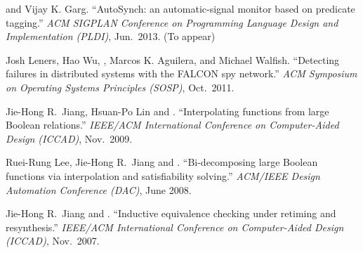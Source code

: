 

\begin{myenumerate}
    \item {} and Vijay K. Garg. ``AutoSynch: an
        automatic-signal monitor based on predicate tagging.'' {\it ACM SIGPLAN
        Conference on Programming Language Design and Implementation (PLDI)},
        Jun.~2013. (To appear)
    \item Josh Leners, Hao Wu, , Marcos K. Aguilera, and 
        Michael Walfish. ``Detecting failures in distributed systems with the 
        FALCON spy network.'' {\it ACM Symposium on Operating Systems 
        Principles (SOSP)}, Oct.~2011.
    \item Jie-Hong R.~Jiang, Hsuan-Po Lin and  .
        ``Interpolating functions from large Boolean relations.'' {\it  
        IEEE/ACM International Conference on Computer-Aided Design (ICCAD)},  
        Nov.~2009.
    \item Ruei-Rung Lee, Jie-Hong R.~Jiang and . 
        ``Bi-decomposing large Boolean functions via interpolation and 
        satisfiability solving.'' {\it ACM/IEEE Design Automation Conference 
        (DAC)}, June 2008. %
    \item Jie-Hong R.~Jiang and . ``Inductive equivalence 
        checking under retiming and resynthesis.'' {\it IEEE/ACM International 
        Conference on Computer-Aided Design (ICCAD)}, Nov.~2007.
\end{myenumerate}
